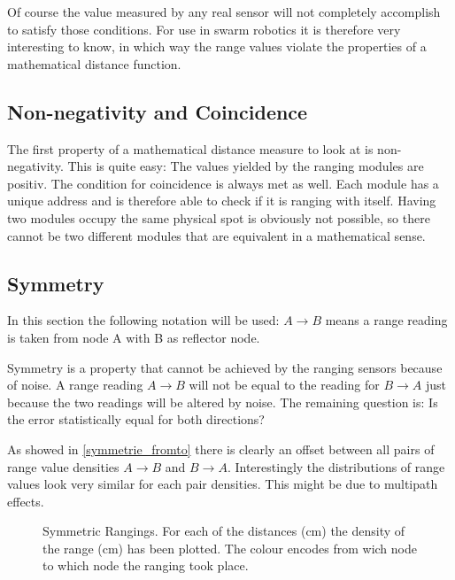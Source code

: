 Of course the value measured by any real sensor will not completely accomplish to satisfy those conditions.
For use in swarm robotics it is therefore very interesting to know, in which way the range values violate the properties of a mathematical distance function.

\subsection{Non-negativity and Coincidence}

The first property of a mathematical distance measure to look at is non-negativity. This is quite easy: The values yielded by the ranging modules are positiv.
The condition for coincidence is always met as well.
Each module has a unique address and is therefore able to check if it is ranging with itself.
Having two modules occupy the same physical spot is obviously not possible, so there cannot be two different modules that are equivalent in a mathematical sense.

\subsection{Symmetry}

In this section the following notation will be used: $A \rightarrow B$ means a range reading is taken from node A with B as reflector node.



Symmetry is a property that cannot be achieved by the ranging sensors because of noise. 
A range reading $A \rightarrow B$ will not be equal to the reading for $B \rightarrow A$ just because the two readings will be altered by noise.
The remaining question is: Is the error statistically equal for both directions?

As showed in \autoref{symmetrie_fromto} there is clearly an offset between all pairs of range value densities $A \rightarrow B$ and $B \rightarrow A$.
Interestingly the distributions of range values look very similar for each pair densities.
This might be due to multipath effects.

\begin{figure}[h]
	\centering
	
	\caption[Symmetric Rangings]{Symmetric Rangings. For each of the distances (cm) the density of the range (cm) has been plotted. The colour encodes from wich node to which node the ranging took place.} 
	\label{symmetrie_fromto}
\end{figure}

